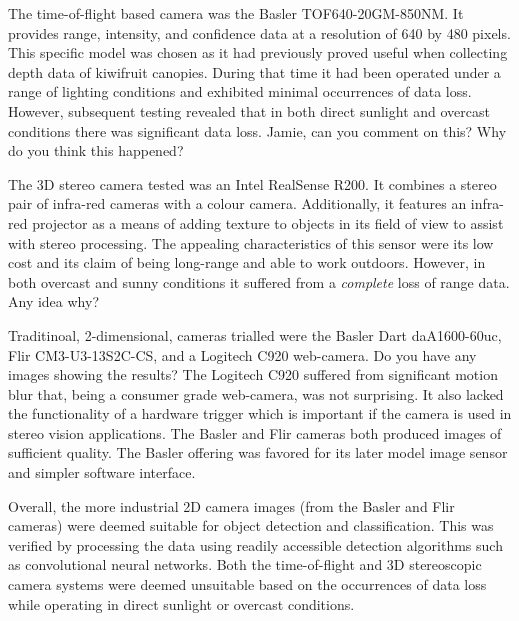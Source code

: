 \documentclass[preprint,authoryear,12pt]{elsarticle}
\begin{document}
        The time-of-flight based camera was the Basler TOF640-20GM-850NM.
        It provides range, intensity, and confidence data at a resolution of 640 by 480 pixels.
        This specific model was chosen as it had previously proved useful when collecting depth data of kiwifruit canopies.
        During that time it had been operated under a range of lighting conditions and exhibited minimal occurrences of data loss.
        However, subsequent testing revealed that in both direct sunlight and overcast conditions there was significant data loss.
        \color{red}Jamie, can you comment on this? Why do you think this happened?\color{black}

        The 3D stereo camera tested was an Intel RealSense R200.
        It combines a stereo pair of infra-red cameras with a colour camera.
        Additionally, it features an infra-red projector as a means of adding texture to objects in its field of view to assist with stereo processing.
        The appealing characteristics of this sensor were its low cost and its claim of being long-range and able to work outdoors.
        However, in both overcast and sunny conditions it suffered from a \emph{complete} loss of range data.
        \color{red}Any idea why?\color{black}

        Traditinoal, 2-dimensional, cameras trialled were the Basler Dart daA1600-60uc, Flir CM3-U3-13S2C-CS, and a Logitech C920 web-camera.
        \color{red}Do you have any images showing the results?\color{black}
        The Logitech C920 suffered from significant motion blur that, being a consumer grade web-camera, was not surprising.
        It also lacked the functionality of a hardware trigger which is important if the camera is used in stereo vision applications.
        The Basler and Flir cameras both produced images of sufficient quality.
        The Basler offering was favored for its later model image sensor and simpler software interface.

        Overall, the more industrial 2D camera images (from the Basler and Flir cameras) were deemed suitable for object detection and classification.
        This was verified by processing the data using readily accessible detection algorithms such as convolutional neural networks.
        Both the time-of-flight and 3D stereoscopic camera systems were deemed unsuitable based on the occurrences of data loss while operating in direct sunlight or overcast conditions.
\end{document}
